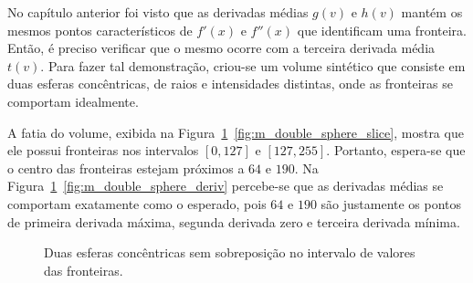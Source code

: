	No capítulo anterior foi visto que as derivadas médias $ g(v) $ e $ h(v) $ mantém os mesmos pontos característicos de $ f'(x) $ e $ f''(x) $ que identificam uma fronteira. Então, é preciso verificar que o mesmo ocorre com a terceira derivada média $ t(v) $. Para fazer tal demonstração, criou-se um volume sintético que consiste em duas esferas concêntricas, de raios e intensidades distintas, onde as fronteiras se comportam idealmente.
	
	A fatia do volume, exibida na Figura~\ref{fig:m_double_sphere}~\ref{fig:m_double_sphere_slice}, mostra que ele possui fronteiras nos intervalos $ [0,127] $ e $ [127,255] $. Portanto, espera-se que o centro das fronteiras estejam próximos a $ 64 $ e $ 190 $. Na Figura~\ref{fig:m_double_sphere}~\ref{fig:m_double_sphere_deriv} percebe-se que as derivadas médias se comportam exatamente como o esperado, pois $ 64 $ e $ 190 $ são justamente os pontos de primeira derivada máxima, segunda derivada zero e terceira derivada mínima.
	
\begin{figure}[h]
	\centering
	\caption{Duas esferas concêntricas sem sobreposição no intervalo de valores das fronteiras.}
	\label{fig:m_double_sphere}
\end{figure}

